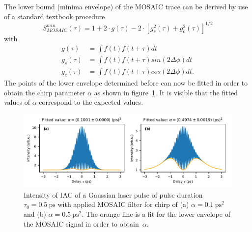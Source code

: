 The lower bound (minima envelope) of the MOSAIC trace can be derived by use of a standard textbook procedure~\cite{klein_optics_1986}
\begin{equation}
S^{min}_{MOSAIC}(\tau)= 1 + 2 \cdot g(\tau) - 2 \cdot [g_s^2(\tau)+g_c^2(\tau)]^{1/2}
\end{equation}
with
\begin{align}
g(\tau)&=\int f(t)f(t+\tau)dt\\
g_s(\tau)&=\int f(t)f(t+\tau)sin(2\Delta\phi)dt\\
g_c(\tau)&=\int f(t)f(t+\tau)cos(2\Delta\phi)dt.
\end{align}
The points of the lower envelope determined before can now be fitted in order to obtain the chirp parameter $\alpha$ as shown in figure~\ref{fig:mosaicchirpedlaserpulsefitenvelope}.
It is visible that the fitted values of $\alpha$ correspond to the expected values.
\begin{figure}[H]
	\centering
	\includegraphics[width=\linewidth]{figures/chirp/plots/mosaic_chirped_laser_pulse_fit_envelope}
	\caption[Intensity of IAC of a Gaussian laser pulse of pulse duration $\tau_0=\SI{0.5}{\pico \second}$ with applied MOSAIC filter and fitted $\alpha$-values.]{Intensity of IAC of a Gaussian laser pulse of pulse duration $\tau_0=\SI{0.5}{\pico \second}$ with applied MOSAIC filter for chirp of (a) $\alpha = \SI{0.1}{\pico \second \squared}$ and (b) $\alpha = \SI{0.5}{\pico \second \squared}$.
		The orange line is a fit for the lower envelope of the MOSAIC signal in order to obtain~$\alpha$.}
	\label{fig:mosaicchirpedlaserpulsefitenvelope}
\end{figure}


